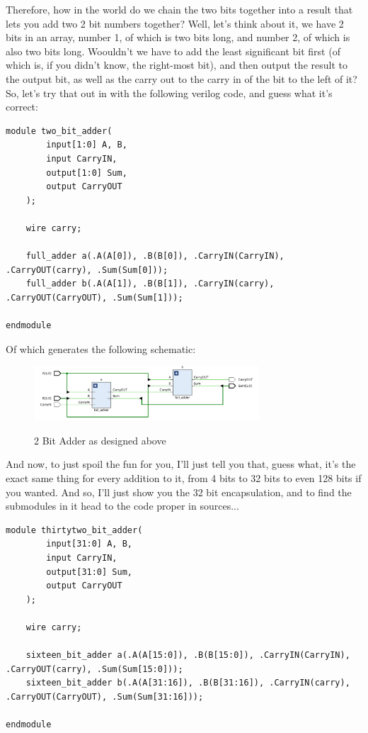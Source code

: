 Therefore, how in the world do we chain the two bits together into a result that lets you add two 2 bit numbers together? Well, let's think about it, we have 2 bits in an array, number 1, of which is two bits long, and number 2, of which is also two bits long. Woouldn't we have to add the least significant bit first (of which is, if you didn't know, the right-most bit), and then output the result to the output bit, as well as the carry out to the carry in of the bit to the left of it? So, let's try that out in with the following verilog code, and guess what it's correct:\\
\begin{lstlisting}[caption={2 Bit Adder Verilog Code}, label={2 Bit Adder Verilog}, style=Verilog]
module two_bit_adder(
        input[1:0] A, B,
        input CarryIN,
        output[1:0] Sum,
        output CarryOUT
    );
    
    wire carry;
    
    full_adder a(.A(A[0]), .B(B[0]), .CarryIN(CarryIN), .CarryOUT(carry), .Sum(Sum[0]));
    full_adder b(.A(A[1]), .B(B[1]), .CarryIN(carry), .CarryOUT(CarryOUT), .Sum(Sum[1]));
    
endmodule
\end{lstlisting}

Of which generates the following schematic:
\begin{figure}[!htbp]
    \centering
    \caption{2 Bit Adder as designed above}
    \includegraphics[width=0.75\textwidth]{pictures/part1/two_bit_adder.png}
    \label{2 Bit Adder}
\end{figure}\newpage

And now, to just spoil the fun for you, I'll just tell you that, guess what, it's the exact same thing for every addition to it, from 4 bits to 32 bits to even 128 bits if you wanted. And so, I'll just show you the 32 bit encapsulation, and to find the submodules in it head to the code proper in sources...
\begin{lstlisting}[caption={32 Bit Adder Verilog Code}, label={32 Bit Adder Verilog}, style=Verilog]
module thirtytwo_bit_adder(
        input[31:0] A, B,
        input CarryIN,
        output[31:0] Sum,
        output CarryOUT
    );
    
    wire carry;
    
    sixteen_bit_adder a(.A(A[15:0]), .B(B[15:0]), .CarryIN(CarryIN), .CarryOUT(carry), .Sum(Sum[15:0]));
    sixteen_bit_adder b(.A(A[31:16]), .B(B[31:16]), .CarryIN(carry), .CarryOUT(CarryOUT), .Sum(Sum[31:16]));
    
endmodule
\end{lstlisting}

